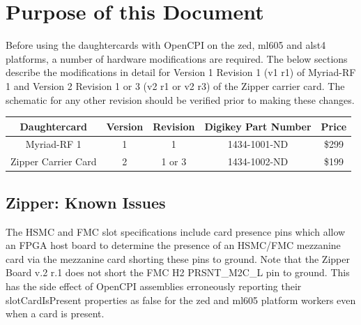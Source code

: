 \documentclass{article}
\begin{document}
\section*{Purpose of this Document}
Before using the daughtercards with OpenCPI on the zed, ml605 and alst4 platforms, a number of hardware modifications are required. The below sections describe the modifications in detail for Version 1 Revision 1 (v1 r1) of Myriad-RF 1 and Version 2 Revision 1 or 3 (v2 r1 or v2 r3) of the Zipper carrier card. The schematic for any other revision should be verified prior to making these changes.
		\begin{table}[h]
			\scriptsize
			\begin{center}
  				\begin{tabular}{|c|c|c|c|c|}
    			\hline
    			\rowcolor{blue}
    			Daughtercard & Version & Revision & Digikey Part Number & Price\\
    			\hline
    			Myriad-RF 1 & 1 & 1 & 1434-1001-ND & \$299\\
    			\hline
    			Zipper Carrier Card & 2 & 1 or 3 & 1434-1002-ND & \$199\\
    			\hline
   				\end{tabular}
   				\label{tab:version_info}
		  	\end{center}
   		\end{table}
\pagebreak

\normalsize
\subsection*{Zipper: Known Issues}
The HSMC and FMC slot specifications include card presence pins which allow an FPGA host board to determine the presence of an HSMC/FMC mezzanine card via the mezzanine card shorting these pins to ground. Note that the Zipper Board v.2 r.1 does not short the FMC H2 PRSNT\_M2C\_L pin to ground. This has the side effect of OpenCPI assemblies erroneously reporting their slotCardIsPresent properties as false for the zed and ml605 platform workers even when a card is present.\par\medskip
\end{document}
